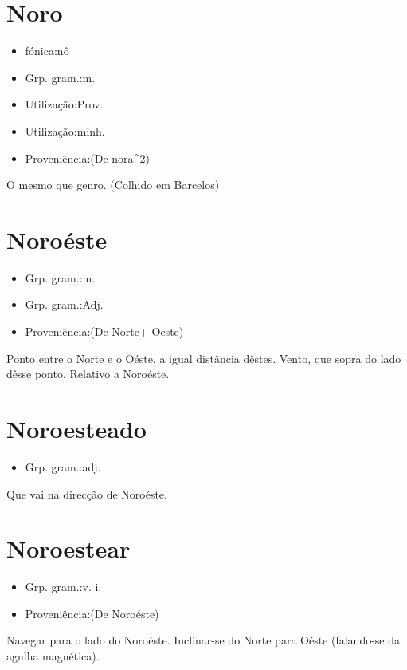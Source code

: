 \section{Noro}
\begin{itemize}
\item {fónica:nô}
\end{itemize}
\begin{itemize}
\item {Grp. gram.:m.}
\end{itemize}
\begin{itemize}
\item {Utilização:Prov.}
\end{itemize}
\begin{itemize}
\item {Utilização:minh.}
\end{itemize}
\begin{itemize}
\item {Proveniência:(De \textunderscore nora\textunderscore ^2)}
\end{itemize}
O mesmo que \textunderscore genro\textunderscore . (Colhido em Barcelos)
\section{Noroéste}
\begin{itemize}
\item {Grp. gram.:m.}
\end{itemize}
\begin{itemize}
\item {Grp. gram.:Adj.}
\end{itemize}
\begin{itemize}
\item {Proveniência:(De \textunderscore Norte\textunderscore  + \textunderscore Oeste\textunderscore )}
\end{itemize}
Ponto entre o Norte e o Oéste, a igual distância dêstes.
Vento, que sopra do lado dêsse ponto.
Relativo a Noroéste.
\section{Noroesteado}
\begin{itemize}
\item {Grp. gram.:adj.}
\end{itemize}
Que vai na direcção de Noroéste.
\section{Noroestear}
\begin{itemize}
\item {Grp. gram.:v. i.}
\end{itemize}
\begin{itemize}
\item {Proveniência:(De \textunderscore Noroéste\textunderscore )}
\end{itemize}
Navegar para o lado do Noroéste.
Inclinar-se do Norte para Oéste (falando-se da agulha magnética).
